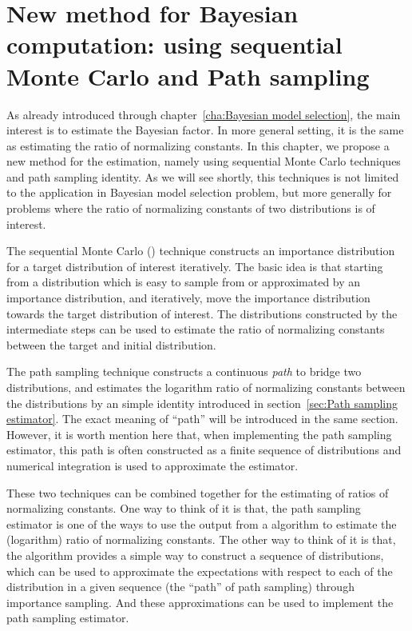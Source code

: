 \chapter{New method for Bayesian computation: using sequential Monte Carlo and
  Path sampling}
\label{cha:New method for Bayesian computation}

As already introduced through chapter~\ref{cha:Bayesian model selection}, the
main interest is to estimate the Bayesian factor. In more general setting, it
is the same as estimating the ratio of normalizing constants. In this chapter,
we propose a new method for the estimation, namely using sequential Monte
Carlo techniques and path sampling identity. As we will see shortly, this
techniques is not limited to the application in Bayesian model selection
problem, but more generally for problems where the ratio of normalizing
constants of two distributions is of interest.

The sequential Monte Carlo (\smc) technique constructs an importance
distribution for a target distribution of interest iteratively. The basic idea
is that starting from a distribution which is easy to sample from or
approximated by an importance distribution, and iteratively, move the
importance distribution towards the target distribution of interest. The
distributions constructed by the intermediate steps can be used to estimate
the ratio of normalizing constants between the target and initial
distribution. \parencite{DelMoral2006}

The path sampling technique constructs a continuous \emph{path} to bridge two
distributions, and estimates the logarithm ratio of normalizing constants
between the distributions by an simple identity introduced in
section~\ref{sec:Path sampling estimator}. The exact meaning of ``path'' will
be introduced in the same section. However, it is worth mention here that,
when implementing the path sampling estimator, this path is often constructed
as a finite sequence of distributions and numerical integration is used to
approximate the estimator. \parencite{Gelman1998}

These two techniques can be combined together for the estimating of ratios of
normalizing constants. One way to think of it is that, the path sampling
estimator is one of the ways to use the output from a \smc algorithm to
estimate the (logarithm) ratio of normalizing constants. The other way to
think of it is that, the \smc algorithm provides a simple way to construct a
sequence of distributions, which can be used to approximate the expectations
with respect to each of the distribution in a given sequence (the ``path'' of
path sampling) through importance sampling. And these approximations can be
used to implement the path sampling estimator.

